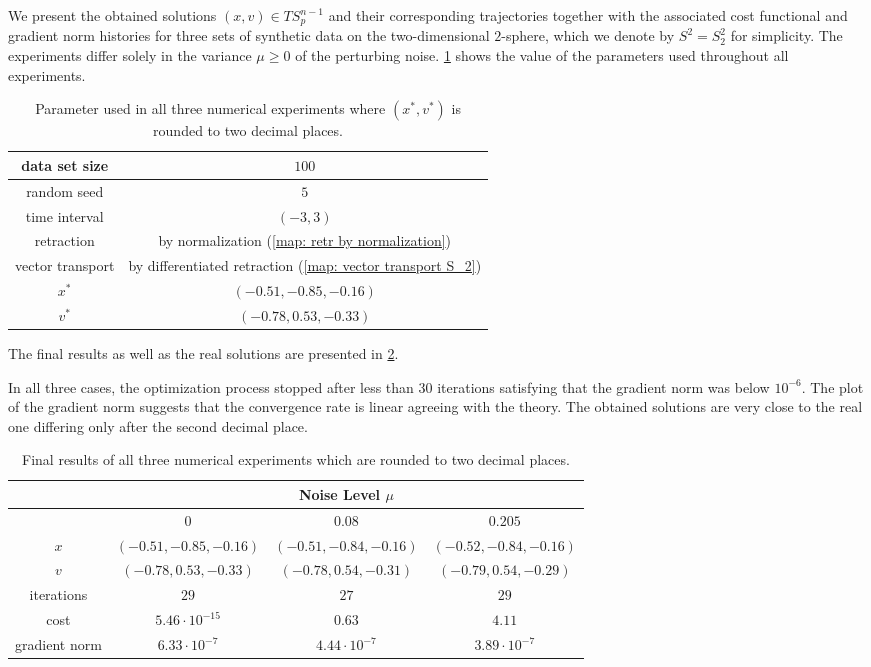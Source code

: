 \documentclass[11pt,a4paper]{article}
\theoremstyle{plain}
\theoremstyle{definition}
\begin{document}
We present the obtained solutions $(x,v)\in TS_p^{n-1}$ and their corresponding trajectories together with the associated cost functional and gradient norm histories for three sets of synthetic data on the two-dimensional $2$-sphere, which we denote by $S^2 = S_2^2$ for simplicity. The experiments differ solely in the variance $\mu\geq 0$ of the perturbing noise. \cref{tab:parameters} shows the value of the parameters used throughout all experiments. 
\begin{table}[h]
	\centering
	\begin{tabular}{|c|c|}
		\hline
		data set size &  $100$\\
		\hline
		random seed & $5$ \\ 
		\hline
		time interval & $(-3, 3)$\\
		\hline
		retraction & by normalization (\ref{map: retr by normalization}) \\
		\hline
		vector transport & by differentiated retraction (\ref{map: vector transport S_2})\\
		\hline
		$x^*$ & $(-0.51, -0.85, -0.16)$\\
		\hline
		$v^*$ & $(-0.78, 0.53, -0.33)$ \\
		\hline
	\end{tabular}
	\caption{Parameter used in all three numerical experiments where $(x^*, v^*)$ is rounded to two decimal places.}
	\label{tab:parameters}
\end{table}
The final results as well as the real solutions are presented in \cref{tab:results}.

In all three cases, the optimization process stopped after less than $30$ iterations satisfying that the gradient norm was below $10^{-6}$. The plot of the gradient norm suggests that the convergence rate is linear agreeing with the theory. The obtained solutions are very close to the real one differing only after the second decimal place.

\begin{table}[h]
	\centering
	\begin{tabular}{|c|c|c|c|}
		\hline
		& \multicolumn{3}{c|}{Noise Level $\mu$}\\
		\hline
		& $0$ & $0.08$ & $0.205$\\
		\hline
		$x$ & $(-0.51, -0.85, -0.16)$ & $(-0.51, -0.84, -0.16)$ & $(-0.52, -0.84, -0.16)$\\
		\hline
		$v$ & $(-0.78, 0.53, -0.33)$ & $(-0.78, 0.54, -0.31)$ & $(-0.79, 0.54, -0.29)$\\
		\hline
		iterations & $29$ & $27$ & $29$\\
		\hline
		cost & $5.46\cdot 10^{-15}$ & $0.63$ & $4.11$\\
		\hline
		gradient norm & $6.33\cdot 10^{-7}$ & $4.44\cdot 10^{-7}$ & $3.89\cdot 10^{-7}$\\
		\hline
	\end{tabular}
	\caption{Final results of all three numerical experiments which are rounded to two decimal places.}
	\label{tab:results}
\end{table}
\end{document}
